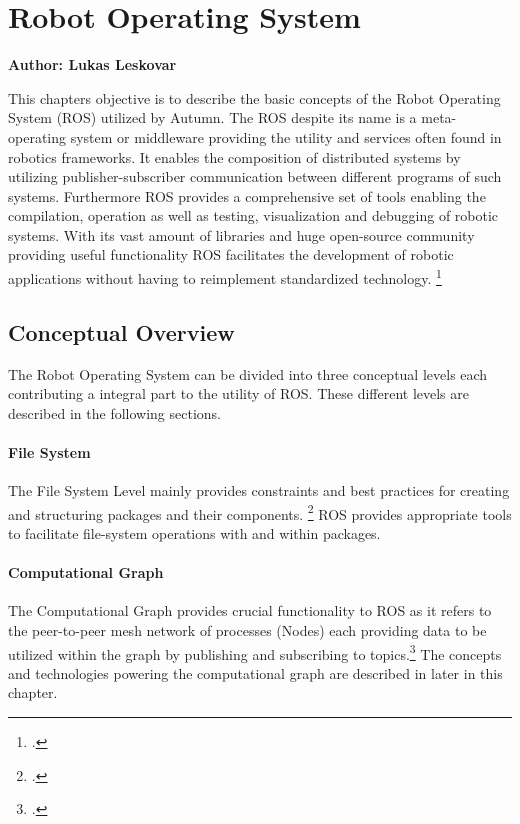 \chapter{Robot Operating System}

\textbf{Author: Lukas Leskovar} 

This chapters objective is to describe the basic concepts of the Robot Operating System (ROS) utilized by Autumn. The ROS despite its name is a meta-operating system or middleware providing the utility and services often found in robotics frameworks. It enables the composition of distributed systems by utilizing publisher-subscriber communication between different programs of such systems. Furthermore ROS provides a comprehensive set of tools enabling the compilation, operation as well as testing, visualization and debugging of robotic systems. With its vast amount of libraries and huge open-source community providing useful functionality ROS facilitates the development of robotic applications without having to reimplement standardized technology. \footcite{openSourceRoboticsFoundationDefinitionNodate}


\section{Conceptual Overview}
The Robot Operating System can be divided into three conceptual levels each contributing a integral part to the utility of ROS. These different levels are described in the following sections. 

\subsubsection{File System}
The File System Level mainly provides constraints and best practices for creating and structuring packages and their components. \footcite{openSourceRoboticsFoundationConceptsNodate}
ROS provides appropriate tools to facilitate file-system operations with and within packages.

\subsubsection{Computational Graph}
The Computational Graph provides crucial functionality to ROS as it refers to the peer-to-peer mesh network of processes (Nodes) each providing data to be utilized within the graph by publishing and subscribing to topics.\citereset\footcite{openSourceRoboticsFoundationConceptsNodate}
The concepts and technologies powering the computational graph are described in later in this chapter.

